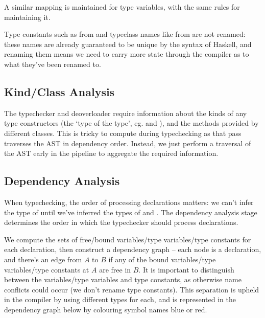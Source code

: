 \documentclass[dissertation.tex]{subfiles}
\begin{document}
{{{            A similar mapping is maintained for type variables, with the same rules for maintaining it.

            Type constants such as  from  and typeclass names like
             from  are not renamed: these names are already guaranteed to be
            unique by the syntax of Haskell, and renaming them means we need to carry more state through the compiler as
            to what they've been renamed to.

        }
        \subsection{Kind/Class Analysis}
        {

            The typechecker and deoverloader require information about the kinds of any type constructors (the `type of
            the type', eg.  and ), and the methods provided by different
            classes. This is tricky to compute during typechecking as that pass traverses the AST in dependency order.
            Instead, we just perform a traversal of the AST early in the pipeline to aggregate the required information.

        }
        \subsection{Dependency Analysis}
        {

            When typechecking, the order of processing declarations matters: we can't infer the type of  until we've inferred the types of  and . The dependency analysis stage
            determines the order in which the typechecker should process declarations.
            
            We compute the sets of free/bound variables/type variables/type constants for each declaration, then
            construct a dependency graph -- each node is a declaration, and there's an edge from \(A\) to \(B\) if any
            of the bound variables/type variables/type constants at \(A\) are free in \(B\). It is important to
            distinguish between the variables/type variables and type constants, as otherwise name conflicts could occur
            (we don't rename type constants). This separation is upheld in the compiler by using different types for
            each, and is represented in the dependency graph below by colouring symbol names blue or red.
            
}}}
\end{document}
